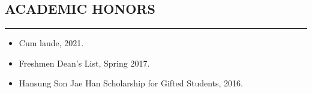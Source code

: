 \documentclass[10pt,a4]{article}
\begin{document}
\begin{small}
%	
%
%	
%
%


\subsection*{ACADEMIC HONORS}
\hrule
\vspace{0.2cm}
\begin{itemize}

\item Cum laude, 2021.

\item Freshmen Dean's List, Spring 2017.

\item Hansung Son Jae Han Scholarship for Gifted Students, 2016.

\end{itemize}

\pagestyle{fancy}
\lhead{\textcolor{gray}{\it Junghyun Lee}}
\fancyfoot[C]{}



\end{small}
\end{document}
